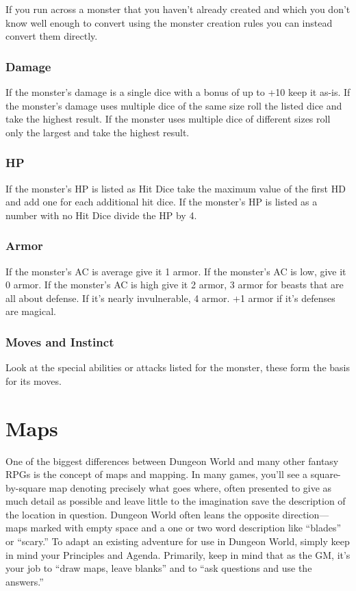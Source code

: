 If you run across a monster that you haven't already created and which you don't know well enough to convert using the monster creation rules you can instead convert them directly.

 
\subsubsection{Damage}   
 

If the monster's damage is a single dice with a bonus of up to +10 keep it as-is. If the monster's damage uses multiple dice of the same size roll the listed dice and take the highest result. If the monster uses multiple dice of different sizes roll only the largest and take the highest result.

 
\subsubsection{HP}   
 

If the monster's HP is listed as Hit Dice take the maximum value of the first HD and add one for each additional hit dice. If the monster's HP is listed as a number with no Hit Dice divide the HP by 4.

 
\subsubsection{Armor}   
 

If the monster's AC is average give it 1 armor. If the monster's AC is low, give it 0 armor. If the monster's AC is high give it 2 armor, 3 armor for beasts that are all about defense. If it's nearly invulnerable, 4 armor. +1 armor if it's defenses are magical.

 
\subsubsection{Moves and Instinct}    
 

Look at the special abilities or attacks listed for the monster, these form the basis for its moves.

 
\section{Maps}   
 

One of the biggest differences between Dungeon World and many other fantasy RPGs is the concept of maps and mapping. In many games, you’ll see a square-by-square map denoting precisely what goes where, often presented to give as much detail as possible and leave little to the imagination save the description of the location in question. Dungeon World often leans the opposite direction—maps marked with empty space and a one or two word description like “blades” or “scary.” To adapt an existing adventure for use in Dungeon World, simply keep in mind your Principles and Agenda. Primarily, keep in mind that as the GM, it’s your job to “draw maps, leave blanks” and to “ask questions and use the answers.”

